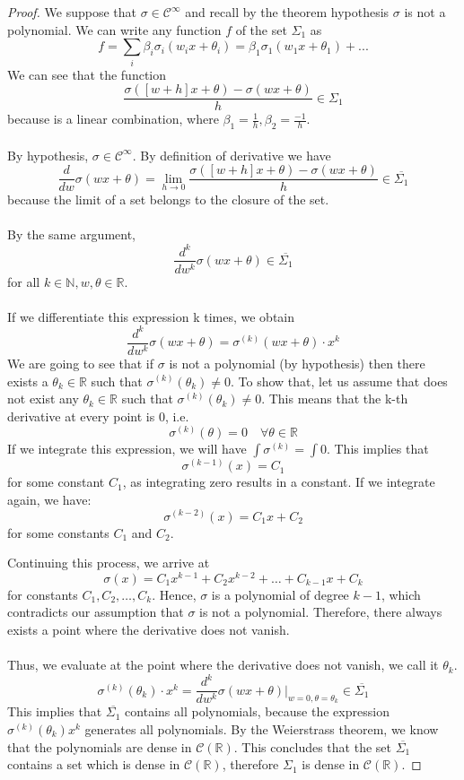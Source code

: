 \documentclass[../main.tex]{subfiles}
\begin{document}
	\begin{proof} %
		We suppose that  $\sigma \in \mathcal{C}^{\infty}$ and recall by the theorem hypothesis $\sigma$ is not a polynomial. 
		 We can write any function $f$ of the set $\Sigma_1$ as $$f=\sum_i \beta_i \sigma_i(w_i x+\theta_i)= \beta_1 \sigma_1(w_1 x+\theta_1)+ ... $$ 
		We can see that the function $$\frac{\sigma([w+h]x + \theta) - \sigma(wx+\theta)}{h} \in \Sigma_1$$ because is a linear combination, where $\beta_1= \frac{1}{h}, \beta_2=\frac{-1}{h}$. \\ \\  By hypothesis, $\sigma \in \mathcal{C}^{\infty}$. By definition of derivative we have
		$$ \frac{d}{dw}\sigma(wx+\theta)= \lim_{h \to 0} \frac{\sigma([w+h]x + \theta) - \sigma(wx+\theta)}{h}  \in \overline{\Sigma_1} %
		$$
		because the limit of a set belongs to the closure of the set. \\  \\ 
		By the same argument, $$\frac{d^k}{dw^k} \sigma(wx+\theta) \in \overline{\Sigma_1}$$  for all $k\in \mathbb{N}, w,\theta \in \mathbb{R}$.\\ \\ 
		 If we differentiate this expression k times, we obtain 
		$$ \frac{d^k}{dw^k}\sigma(wx+\theta) = \sigma^{(k)}(wx+\theta) \cdot x^{k}$$
		We are going to see that if $\sigma$ is not a polynomial (by hypothesis) then there exists a $\theta_k\in \mathbb{R}$ such that $\sigma^{(k)}(\theta_k)  \neq 0$. To show that, let us assume that does not exist any $ \theta_k \in \mathbb{R}$ such that $\sigma^{(k)}(\theta_k)  \neq 0$. This means that the k-th derivative at every point is 0, i.e. $$\sigma^{(k)}(\theta)=0  \quad \forall \theta \in \mathbb{R} $$
		\noindent  If we integrate this expression, we will have
			$\int \sigma^{(k)}= \int 0$. This implies that $$\sigma^{(k-1)}(x) = C_1$$ for some constant $C_1$, as integrating zero results in a constant. If we integrate again, we have: $$\sigma^{(k-2)}(x) = C_1x + C_2$$ for some constants $C_1$ and $C_2$.
		
		\noindent Continuing this process, we arrive at $$\sigma(x) = C_1x^{k-1} + C_2x^{k-2} + \ldots + C_{k-1}x + C_k$$ for constants $C_1, C_2, \ldots, C_k$. Hence, $\sigma$ is a polynomial of degree $k-1$, which contradicts our assumption that $\sigma$ is not a polynomial. Therefore, there always exists a point where the derivative does not vanish. \\  \\ 
		Thus, we evaluate at the point where the derivative does not vanish, we call it $\theta_k$.
		$$  \sigma^{(k)}(\theta_k) \cdot x^{k}=\frac{d^k}{dw^k}\sigma(wx+\theta) \Bigr|_{w=0, \theta=\theta_k} \in  \overline{\Sigma_1} $$ 
		This implies that $\overline{\Sigma_1}$ contains all polynomials, because the expression $\sigma^{(k)}(\theta_k) x^{k}$ generates all polynomials. By the Weierstrass theorem, we know that the polynomials are dense in $\mathcal{C}(\mathbb{R})$. This concludes that the set $\overline{\Sigma_1}$ contains a set which is dense in  $\mathcal{C}(\mathbb{R})$, therefore $\Sigma_1$ is dense in $\mathcal{C}(\mathbb{R})$.
	\end{proof} 
\end{document}
